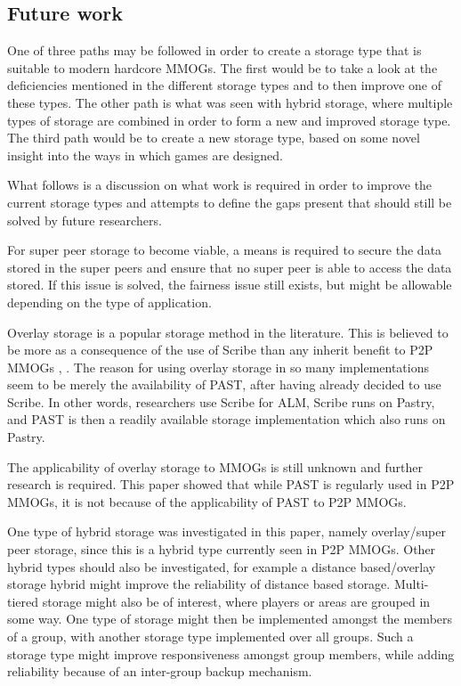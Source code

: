 \documentclass[10pt,a4paper,journal,cspaper,compsoc]{IEEEtran}
\begin{document}
\subsection{Future work}
One of three paths may be followed in order to create a storage type that is suitable to modern hardcore MMOGs. The first would be to take a look at
the deficiencies mentioned in the different storage types and to then improve one of these types. The other path is what was seen with hybrid
storage, where multiple types of storage are combined in order to form a new and improved storage type. The third path would be to create a new
storage type, based on some novel insight into the ways in which games are designed.

What follows is a discussion on what work is required in order to improve the current storage types and attempts to define the gaps present that
should still be solved by future researchers.

For super peer storage to become viable, a means is required to secure the data stored in the super peers and ensure that no super peer is able to
access the data stored. If this issue is solved, the fairness issue still exists, but might be allowable depending on the type of application.

Overlay storage is a popular storage method in the literature. This is believed to be more as a consequence of the use of Scribe \cite{scribe} than
any inherit benefit to P2P MMOGs \cite{past_storage_focus}, \cite{Fan_phd}. The reason for using overlay storage in so many implementations seem to
be merely the availability of PAST, after having already decided to use Scribe. In other words, researchers use Scribe for ALM, Scribe runs on
Pastry, and PAST is then a readily available storage implementation which also runs on Pastry.

The applicability of overlay storage to MMOGs is still unknown and further research is required. This paper showed that while PAST is regularly used
in P2P MMOGs, it is not because of the applicability of PAST to P2P MMOGs.

One type of hybrid storage was investigated in this paper, namely overlay/super peer storage, since this is a hybrid type currently seen in P2P
MMOGs. Other hybrid types should also be investigated, for example a distance based/overlay storage hybrid might improve the reliability of distance
based storage. Multi-tiered storage might also be of interest, where players or areas are grouped in some way. One type of storage might then be
implemented amongst the members of a group, with another storage type implemented over all groups. Such a storage type might improve responsiveness
amongst group members, while adding reliability because of an inter-group backup mechanism.
\end{document}
